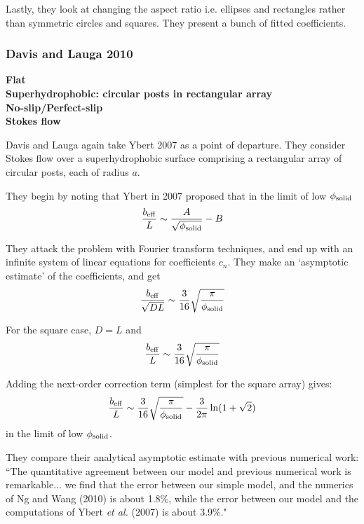 \documentclass{article}
\newcommand{\beff}{\ensuremath{b_{\mathrm{eff}}}}
\begin{document}
Lastly, they look at changing the aspect ratio i.e. ellipses and rectangles rather than symmetric circles and squares.  They present a bunch of fitted coefficients.



\subsubsection*{Davis and Lauga 2010}
\textbf{Flat\\ Superhydrophobic: circular posts in rectangular array
\\ No-slip/Perfect-slip\\ Stokes flow}

Davis and Lauga again take Ybert 2007 as a point of departure. They consider Stokes flow over a superhydrophobic surface comprising a rectangular array of circular posts, each of radius $a$.
\vspace*{1em}

\vspace*{1em}

They begin by noting that Ybert in 2007 proposed that in the limit of low $\phi_{\mathrm{solid}}$
\[ \frac{\beff}{L} \sim \frac{A}{\sqrt{\phisol}} - B \]

They attack the problem with Fourier transform techniques, and end up with an infinite system of linear equations for coefficients $c_n$.  They make an `asymptotic estimate' of the coefficients, and get 
\[ \frac{\beff}{\sqrt{DL}} \sim \frac{3}{16} \sqrt{\frac{\pi}{\phisol}} \]

For the square case, $D=L$ and
\[ \frac{\beff}{L} \sim \frac{3}{16} \sqrt{\frac{\pi}{\phisol}} \]

Adding the next-order correction term (simplest for the square array) gives:
\[ \frac{\beff}{L} \sim \frac{3}{16} \sqrt{\frac{\pi}{\phisol}}
- \frac{3}{2 \pi} \ln (1 + \sqrt{2}) \]
in the limit of low $\phi_{\mathrm{solid}}$.

They compare their analytical asymptotic estimate with previous numerical work: ``The quantitative agreement between our model and previous numerical work is remarkable... we find that the error between our simple model, and the numerics of Ng and Wang (2010) is about 1.8\%, while the error between our model and the computations of Ybert \emph{et al.} (2007) is about 3.9\%."
\end{document}
